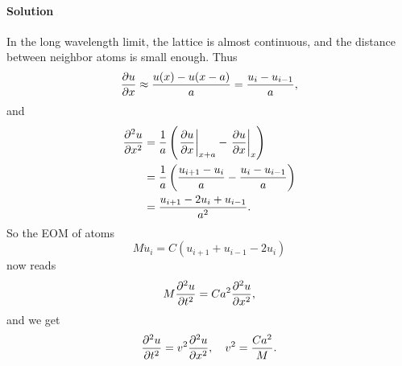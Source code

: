 \documentclass[hyperref, a4paper]{article}
\begin{document}
\paragraph{Solution} In the long wavelength limit,
the lattice is almost continuous,
and the distance between neighbor atoms is small enough.
Thus 
\begin{equation}
    \pdv{u}{x} \approx \frac{u(x) - u(x-a)}{a} = \frac{u_{i} - u_{i-1}}{a},
\end{equation}
and 
\begin{equation}
    \begin{aligned}
        \pdv[2]{u}{x} &= \frac{1}{a} 
        \left( \eval{\pdv{u}{x}}_{x + a} - \eval{\pdv{u}{x}}_{x} \right) \\
        &= \frac{1}{a} \left( \frac{u_{i+1} - u_i}{a} - \frac{u_i - u_{i-1}}{a} \right) \\
        &= \frac{u_{i+1} - 2u_i + u_{i-1}}{a^2}.
    \end{aligned}
\end{equation}
So the EOM of atoms 
\begin{equation}
    M \ddot{u}_i = C (u_{i+1} + u_{i-1} - 2u_i)
\end{equation}
now reads 
\[
    M \pdv[2]{u}{t} = C a^2 \pdv[2]{u}{x},
\]
and we get 
\begin{equation}
    \pdv[2]{u}{t} = v^2 \pdv[2]{u}{x}, \quad v^2 = \frac{C a^2}{M}.
\end{equation}
\end{document}
